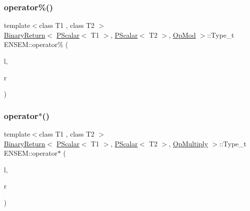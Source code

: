 \subsubsection{\texorpdfstring{operator\%()}{operator\%()}}
{\footnotesize\ttfamily template$<$class T1 , class T2 $>$ \\
\mbox{\hyperlink{structENSEM_1_1BinaryReturn}{Binary\+Return}}$<$ \mbox{\hyperlink{classENSEM_1_1PScalar}{P\+Scalar}}$<$ T1 $>$, \mbox{\hyperlink{classENSEM_1_1PScalar}{P\+Scalar}}$<$ T2 $>$, \mbox{\hyperlink{structENSEM_1_1OpMod}{Op\+Mod}} $>$\+::Type\+\_\+t E\+N\+S\+E\+M\+::operator\% (\begin{DoxyParamCaption}\item[{const \mbox{\hyperlink{classENSEM_1_1PScalar}{P\+Scalar}}$<$ T1 $>$ \&}]{l,  }\item[{const \mbox{\hyperlink{classENSEM_1_1PScalar}{P\+Scalar}}$<$ T2 $>$ \&}]{r }\end{DoxyParamCaption})\hspace{0.3cm}{\ttfamily [inline]}}

\mbox{\label{group__primscalar_ga73b8e82a534a7eb469fb90a9e25271df}} 
\subsubsection{\texorpdfstring{operator$\ast$()}{operator*()}\hspace{0.1cm}{\footnotesize\ttfamily [1/5]}}
{\footnotesize\ttfamily template$<$class T1 , class T2 $>$ \\
\mbox{\hyperlink{structENSEM_1_1BinaryReturn}{Binary\+Return}}$<$ \mbox{\hyperlink{classENSEM_1_1PScalar}{P\+Scalar}}$<$ T1 $>$, \mbox{\hyperlink{classENSEM_1_1PScalar}{P\+Scalar}}$<$ T2 $>$, \mbox{\hyperlink{structENSEM_1_1OpMultiply}{Op\+Multiply}} $>$\+::Type\+\_\+t E\+N\+S\+E\+M\+::operator$\ast$ (\begin{DoxyParamCaption}\item[{const \mbox{\hyperlink{classENSEM_1_1PScalar}{P\+Scalar}}$<$ T1 $>$ \&}]{l,  }\item[{const \mbox{\hyperlink{classENSEM_1_1PScalar}{P\+Scalar}}$<$ T2 $>$ \&}]{r }\end{DoxyParamCaption})\hspace{0.3cm}{\ttfamily [inline]}}

\mbox{\label{group__primscalar_gaa4466bc56a8afcb00e7d7e37cc22d441}} 
